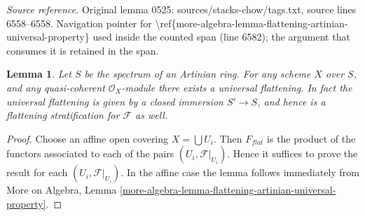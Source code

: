 \documentclass[10pt,a4paper]{amsart}
\theoremstyle{plain}
\newtheorem{lemma}[subsection]{Lemma}
\theoremstyle{definition}
\theoremstyle{remark}
\numberwithin{equation}{subsection}
\begin{document}
\noindent\textit{Source reference.} Original lemma 0525: sources/stacks-chow/tags.txt, source lines 6558--6558. Navigation pointer for \textbackslash{}ref\{more-algebra-lemma-flattening-artinian-universal-property\} used inside the counted span (line 6582); the argument that consumes it is retained in the span.\par\medskip
\begin{lemma}
\label{lemma-flattening-stratification-artinian}
Let $S$ be the spectrum of an Artinian ring.
For any scheme $X$ over $S$, and any quasi-coherent $\mathcal{O}_X$-module
there exists a universal flattening. In fact the universal flattening
is given by a closed immersion $S' \to S$, and hence is a flattening
stratification for $\mathcal{F}$ as well.
\end{lemma}

\begin{proof}
Choose an affine open covering $X = \bigcup U_i$.
Then $F_{flat}$ is the product of the functors associated to
each of the pairs $(U_i, \mathcal{F}|_{U_i})$.
Hence it suffices to prove the result for each
$(U_i, \mathcal{F}|_{U_i})$.
In the affine case the lemma follows immediately from
More on Algebra,
Lemma \ref{more-algebra-lemma-flattening-artinian-universal-property}.
\end{proof}
\end{document}

